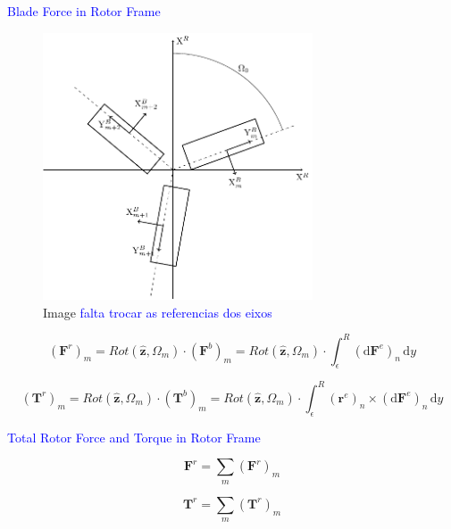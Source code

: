 \textcolor{blue}{Blade Force in Rotor Frame}

\begin{figure}[!htb]
    \centering
        \includegraphics[width=8cm]{Figures/implementation/bet/blade_forces/multiple_blades_reference.pdf}
        \caption{Image \textcolor{blue}{falta trocar as referencias dos eixos}}
\end{figure}

\begin{equation}
    \left(\mathbf{F}^{r}\right)_m = Rot(\hat{\mathbf{z}}, \Omega_m) \cdot \left(\mathbf{F}^{b}\right)_m = Rot(\hat{\mathbf{z}}, \Omega_m) \cdot \int_\epsilon^R \left( \mathrm{d}\mathbf{F}^{e}\right)_n \, \mathrm{d}y
\end{equation}

\begin{equation}
    \left(\mathbf{T}^{r}\right)_m = Rot(\hat{\mathbf{z}}, \Omega_m) \cdot \left(\mathbf{T}^{b}\right)_m = Rot(\hat{\mathbf{z}}, \Omega_m) \cdot \int_\epsilon^R \left(\mathbf{r}^e \right)_n \times \left( \mathrm{d}\mathbf{F}^{e}\right)_n \, \mathrm{d}y
\end{equation}


\textcolor{blue}{Total Rotor Force and Torque in Rotor Frame}

\begin{equation}
    \mathbf{F}^{r} = \sum_m \left(\mathbf{F}^{r}\right)_m
\end{equation}


\begin{equation}
    \mathbf{T}^{r} = \sum_m \left(\mathbf{T}^{r}\right)_m 
\end{equation}


